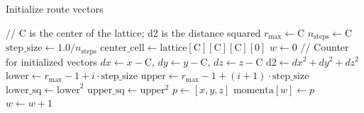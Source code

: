 \documentclass[12pt,english]{article}
\begin{document}

\begin{algorithm}
\caption{Initialize route vectors}
\label{algo:initPoleVectors}
\begin{algorithmic}[1]
\STATE // C is the center of the lattice; d2 is the distance squared 
\STATE $r_{\text{max}} \gets \text{C}$
\STATE $n_{\text{steps}} \gets \text{C}$
\STATE $\text{step\_size} \gets 1.0 / n_{\text{steps}}$
\STATE $\text{center\_cell} \gets \text{lattice}[\text{C}][\text{C}][\text{C}][0]$
\STATE $w \gets 0$ // Counter for initialized vectors
            \STATE $dx \gets x - \text{C}$, $dy \gets y - \text{C}$, $dz \gets z - \text{C}$
            \STATE $\text{d2} \gets dx^2 + dy^2 + dz^2$
                \STATE $\text{lower} \gets r_{\text{max}} - 1 + i \cdot \text{step\_size}$
                \STATE $\text{upper} \gets r_{\text{max}} - 1 + (i + 1) \cdot \text{step\_size}$
                \STATE $\text{lower\_sq} \gets \text{lower}^2$
                \STATE $\text{upper\_sq} \gets \text{upper}^2$
                    \STATE $p \gets [x, y, z]$
                    \STATE $\text{momenta}[w] \gets p$
                    \STATE $w \gets w + 1$
                        \RETURN
                    \ENDIF
                \ENDIF
            \ENDFOR
        \ENDFOR
    \ENDFOR
\ENDFOR
\end{algorithmic}
\end{algorithm}
\end{document}
